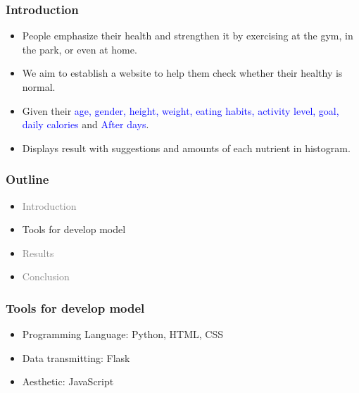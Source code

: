 \documentclass[fleqn]{beamer}
\begin{document}
\begin{frame}
\frametitle{Introduction}
\begin{itemize}
    \item People emphasize their health and strengthen it by exercising at the gym, in the park, or even at home.
    \vspace{0.15 cm}
    \item We aim to establish a website to help them check whether their \alert{healthy} is normal.
    \vspace{0.15 cm}
    \item Given their \textcolor{blue}{age, gender, height, weight, eating habits, activity level, goal, daily calories} and \textcolor{blue}{After days}. 
    \vspace{0.15 cm}
    \item Displays result with suggestions and amounts of each nutrient in histogram.
    \vspace{0.15 cm}
\end{itemize}
\end{frame}
\begin{frame}
\frametitle{Outline}
\begin{itemize}
        \item \textcolor{gray}{Introduction}
        \vspace{0.15 cm}
        \item Tools for develop model
        \vspace{0.15 cm}
        \item \textcolor{gray}{Results}
        \vspace{0.15 cm}
        \item \textcolor{gray}{Conclusion}
        \vspace{0.15 cm}
\end{itemize}
\end{frame}
\begin{frame}
\frametitle{Tools for develop model}
\begin{itemize}
    \item Programming Language: Python, HTML, CSS \\
    \vspace{0.15 cm}
    \item Data transmitting: Flask \\
    \vspace{0.15 cm}
    \item Aesthetic: JavaScript \vspace{0.15 cm}
\end{itemize}
\end{frame}
\end{document}
